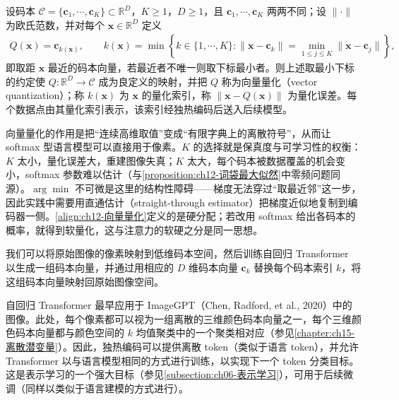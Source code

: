 \documentclass[../../main.tex]{subfiles}
\begin{document}
\begin{definition}[向量量化]\label{definition:ch12-向量量化}
设码本 $\mathcal{C}=\{\mathbf{c}_1,\cdots,\mathbf{c}_K\}\subset\mathbb{R}^{D}$，$K\geqslant1$，$D\geqslant1$，且 $\mathbf{c}_1,\cdots,\mathbf{c}_K$ 两两不同；设 $\|\cdot\|$ 为欧氏范数，并对每个 $\mathbf{x}\in\mathbb{R}^{D}$ 定义
\begin{align*}
Q(\mathbf{x})=\mathbf{c}_{k(\mathbf{x})},\qquad k(\mathbf{x})=\min\left\{k\in\{1,\cdots,K\}:\|\mathbf{x}-\mathbf{c}_k\|=\min_{1\leqslant j\leqslant K}\|\mathbf{x}-\mathbf{c}_j\|\right\},
\end{align*}
即取距 $\mathbf{x}$ 最近的码本向量，若最近者不唯一则取下标最小者。则上述取最小下标的约定使 $Q:\mathbb{R}^{D}\to\mathcal{C}$ 成为良定义的映射，并把 $Q$ 称为向量量化（vector quantization）；称 $k(\mathbf{x})$ 为 $\mathbf{x}$ 的量化索引，称 $\|\mathbf{x}-Q(\mathbf{x})\|$ 为量化误差。每个数据点由其量化索引表示，该索引经独热编码后送入后续模型。
\end{definition}

\begin{remark}
向量量化的作用是把“连续高维取值”变成“有限字典上的离散符号”，从而让 softmax 型语言模型可以直接用于像素。$K$ 的选择就是保真度与可学习性的权衡：$K$ 太小，量化误差大，重建图像失真；$K$ 太大，每个码本被数据覆盖的机会变小，softmax 参数难以估计（与\cref{proposition:ch12-词袋最大似然}中零频问题同源）。$\arg\min$ 不可微是这里的结构性障碍——梯度无法穿过“取最近邻”这一步，因此实践中需要用直通估计（straight-through estimator）把梯度近似地复制到编码器一侧。\eqref{align:ch12-向量量化}定义的是硬分配；若改用 softmax 给出各码本的概率，就得到软量化，这与注意力的软硬之分是同一思想。
\end{remark}

我们可以将原始图像的像素映射到低维码本空间，然后训练自回归 Transformer 以生成一组码本向量，并通过用相应的 $D$ 维码本向量 $\mathbf{c}_k$ 替换每个码本索引 $k$，将这组码本向量映射回原始图像空间。

自回归 Transformer 最早应用于 ImageGPT（Chen, Radford, et al., 2020）中的图像。此处，每个像素都可以视为一组离散的三维颜色码本向量之一，每个三维颜色码本向量都与颜色空间的 $k$ 均值聚类中的一个聚类相对应（参见\cref{chapter:ch15-离散潜变量}）。因此，独热编码可以提供离散 token（类似于语言 token），并允许 Transformer 以与语言模型相同的方式进行训练，以实现下一个 token 分类目标。这是表示学习的一个强大目标（参见\cref{subsection:ch06-表示学习}），可用于后续微调（同样以类似于语言建模的方式进行）。
\end{document}
